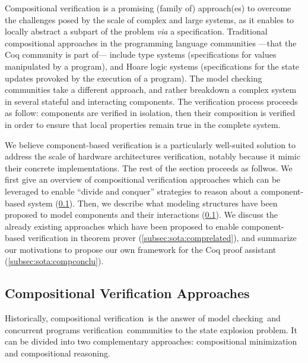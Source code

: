 Compositional verification is a promising (family of) approach(es) to overcome
the challenges posed by the scale of complex and large systems, as it enables to
locally abstract a subpart of the problem \emph{via} a specification.
%
Traditional compositional approaches in the programming language communities
---that the Coq community is part of--- include type
systems%
(specifications for values manipulated by a program), and Hoare logic systems
(specifications for the state updates provoked by the execution of a program).
%
The model checking communities take a different approach, and rather breakdown a
complex system in several stateful and interacting components.
%
The verification process proceeds as follow: components are verified in
isolation, then their composition is verified in order to ensure that local
properties remain true in the complete system.

We believe component-based verification is a particularly well-suited solution
to address the scale of hardware architectures verification, notably because it
mimic their concrete implementations.
%
The rest of the section proceeds as follwos.
%
We first give an overview of compositional verification approaches which can be
leveraged to enable ``divide and conquer'' strategies to reason about a
component-based system (\ref{subsec:sota:compverif}).
%
Then, we describe what modeling structures have been proposed to model
components and their interactions (\ref{subsec:sota:compverif}).
%
We discuss the already existing approaches which have been proposed to enable
component-based verification in theorem prover (\ref{subsec:sota:comprelated}),
and summarize our motivations to propose our own framework for the Coq proof
assistant (\ref{subsec:sota:compconclu}).

\subsection{Compositional Verification Approaches}
\label{subsec:sota:compverif}

Historically, compositional verification\,\cite{peng1998survey} is the answer of
model checking\,\cite{mcmillan1989compositional} and concurrent programs
verification\,\cite{jones1983tentative} communities to the state explosion
problem.
%
It can be divided into two complementary approaches: compositional minimization
and compositional reasoning.

